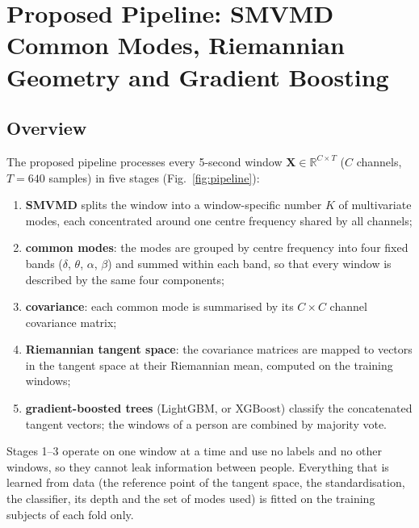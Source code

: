 \chapter{Proposed Pipeline: SMVMD Common Modes, Riemannian Geometry and Gradient Boosting}
\thispagestyle{empty}
\label{ch:pipeline}

\section{Overview}
The proposed pipeline processes every 5-second window $\mathbf{X}\in\mathbb{R}^{C\times T}$
($C$ channels, $T=640$ samples) in five stages (Fig.~\ref{fig:pipeline}):
\begin{enumerate}
\item \textbf{SMVMD} splits the window into a window-specific number $K$ of multivariate modes,
      each concentrated around one centre frequency shared by all channels;
\item \textbf{common modes}: the modes are grouped by centre frequency into four fixed bands
      ($\delta$, $\theta$, $\alpha$, $\beta$) and summed within each band, so that every window
      is described by the same four components;
\item \textbf{covariance}: each common mode is summarised by its $C\times C$ channel covariance
      matrix;
\item \textbf{Riemannian tangent space}: the covariance matrices are mapped to vectors in the
      tangent space at their Riemannian mean, computed on the training windows;
\item \textbf{gradient-boosted trees} (LightGBM, or XGBoost) classify the concatenated tangent
      vectors; the windows of a person are combined by majority vote.
\end{enumerate}
Stages 1--3 operate on one window at a time and use no labels and no other windows, so they
cannot leak information between people. Everything that is learned from data (the reference
point of the tangent space, the standardisation, the classifier, its depth and the set of modes
used) is fitted on the training subjects of each fold only.

